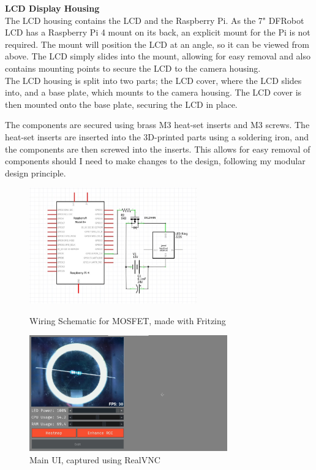 \noindent
\textbf{LCD Display Housing}
\label{sec:lcdhousing} \\
The LCD housing contains the LCD and the Raspberry Pi. As the 7" DFRobot LCD has a Raspberry Pi 4 mount on its back,
an explicit mount for the Pi is not required. The mount will position the LCD at an angle, so it can be viewed from above. The LCD
simply slides into the mount, allowing for easy removal and also contains mounting points to secure the LCD to the camera housing. \\
The LCD housing is split into two parts; the LCD cover, where the LCD slides into, and a base plate, which mounts to the camera housing.
The LCD cover is then mounted onto the base plate, securing the LCD in place.

The components are secured using brass M3 heat-set inserts and M3 screws. The heat-set inserts are inserted into the 3D-printed parts using a soldering iron,
and the components are then screwed into the inserts. This allows for easy removal of components should I need to make changes to the design, following
my modular design principle.
\begin{figure}
    \begin{minipage}[t]{0.49\textwidth}
      \centering
      \includegraphics[width=\textwidth,height=5cm, keepaspectratio]{imgs/wiring.jpg}
      \caption{Wiring Schematic for MOSFET, made with Fritzing\cite{fritzing}}
      \label{fig:wiringschematic}
    \end{minipage}
    \hfill
    \begin{minipage}[t]{0.49\textwidth}
        \centering
        \includegraphics[width=\textwidth,height=5cm, keepaspectratio]{imgs/software/realvnc.jpg}
        \caption{Main UI, captured using RealVNC\cite{realvnc}}
        \label{fig:mainui}
    \end{minipage}
  \end{figure}
  